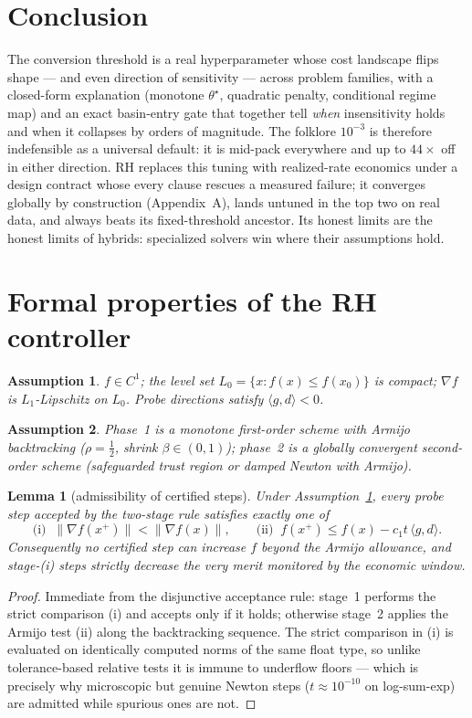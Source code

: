 ﻿\documentclass[10pt]{article}
\newtheorem{lemma}{Lemma}
\newtheorem{assumption}{Assumption}
\begin{document}
\section{Conclusion}
The conversion threshold is a real hyperparameter whose cost landscape
flips shape --- and even direction of sensitivity --- across problem
families, with a closed-form explanation (monotone $\theta^\star$,
quadratic penalty, conditional regime map) and an exact basin-entry
gate that together tell \emph{when} insensitivity holds and when it
collapses by orders of magnitude. The folklore $10^{-3}$ is therefore
indefensible as a universal default: it is mid-pack everywhere and up
to $44\times$ off in either direction. RH replaces this tuning with
realized-rate economics under a design contract whose every clause
rescues a measured failure; it converges globally by construction
(Appendix~A), lands untuned in the top two on real data, and always
beats its fixed-threshold ancestor. Its honest limits are the honest
limits of hybrids: specialized solvers win where their assumptions
hold.

\appendix
\section{Formal properties of the RH controller}\label{app:proofs}

\begin{assumption}\label{a:lipschitz}
$f\in C^1$; the level set $L_0=\{x: f(x)\le f(x_0)\}$ is compact;
$\nabla f$ is $L_1$-Lipschitz on $L_0$. Probe directions satisfy
$\langle g,d\rangle<0$.
\end{assumption}
\begin{assumption}\label{a:phases}
Phase~1 is a monotone first-order scheme with Armijo backtracking
($\rho=\tfrac12$, shrink $\beta\in(0,1)$); phase~2 is a globally
convergent second-order scheme (safeguarded trust region or damped
Newton with Armijo).
\end{assumption}

\begin{lemma}[admissibility of certified steps]\label{lem:adm}
Under Assumption~\ref{a:lipschitz}, every probe step accepted by the
two-stage rule satisfies exactly one of
\begin{equation}
\text{(i)}\;\; \|\nabla f(x^+)\| < \|\nabla f(x)\|,
\qquad
\text{(ii)}\;\; f(x^+) \le f(x) - c_1 t\,\langle g,d\rangle .
\end{equation}
Consequently no certified step can increase $f$ beyond the Armijo
allowance, and stage-(i) steps strictly decrease the very merit
monitored by the economic window.
\end{lemma}
\begin{proof}
Immediate from the disjunctive acceptance rule: stage~1 performs the
strict comparison (i) and accepts only if it holds; otherwise stage~2
applies the Armijo test (ii) along the backtracking sequence. The
strict comparison in (i) is evaluated on identically computed norms of
the same float type, so unlike tolerance-based relative tests it is
immune to underflow floors --- which is precisely why microscopic but
genuine Newton steps ($t\approx 10^{-10}$ on log-sum-exp) are admitted
while spurious ones are not.
\end{proof}
\end{document}
